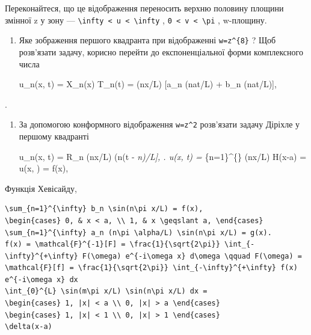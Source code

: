 \documentclass[
  ukrainian,
]{article}
\begin{document}
Переконайтеся, що це відображення переносить верхню половину площини
змінної z у зону ---
\texttt{\textbackslash{}infty\ \textless{}\ u\ \textless{}\ \textbackslash{}infty}
, \texttt{0\ \textless{}\ v\ \textless{}\ \textbackslash{}pi} ,
w-площину.

\begin{enumerate}
\def\labelenumi{\arabic{enumi}.}
\setcounter{enumi}{1}
\item
  Яке зображення першого квадранта при відображенні
  \texttt{w=z\^{}\{8\}} ? Щоб розв'язати задачу, корисно перейти до
  експоненціальної форми комплексного числа

  u\_n(x, t) = X\_n(x) T\_n(t) = \sin(n\pi x/L) {[}a\_n \sin(n\pi at/L)
  + b\_n \cos(n\pi at/L){]},
\end{enumerate}

.

\begin{enumerate}
\def\labelenumi{\arabic{enumi}.}
\setcounter{enumi}{2}
\item
  За допомогою конформного відображення \texttt{w=z\^{}2} розв'язати
  задачу Діріхле у першому квадранті

  u\_n(x, t) = R\_n \sin(n\pi x/L) \cos(n\pi\alpha (t -
  \delta\emph{n)/L{]}, \right. u(x, t) = \sum}\{n=1\}\^{}\{\infty\}
  \sin(n\pi x/L)
   H(x-a) = u(x, \theta) = f(x),
\end{enumerate}

Функція Хевісайду,

\begin{verbatim}
\sum_{n=1}^{\infty} b_n \sin(n\pi x/L) = f(x),
\begin{cases} 0, & x < a, \\ 1, & x \geqslant a, \end{cases}
\sum_{n=1}^{\infty} a_n (n\pi \alpha/L) \sin(n\pi x/L) = g(x).
f(x) = \mathcal{F}^{-1}[F] = \frac{1}{\sqrt{2\pi}} \int_{-\infty}^{+\infty} F(\omega) e^{-i\omega x} d\omega \qquad F(\omega) = \mathcal{F}[f] = \frac{1}{\sqrt{2\pi}} \int_{-\infty}^{+\infty} f(x) e^{-i\omega x} dx
\int_{0}^{L} \sin(m\pi x/L) \sin(n\pi x/L) dx =
\begin{cases} 1, |x| < a \\ 0, |x| > a \end{cases}
\begin{cases} 1, |x| < 1 \\ 0, |x| > 1 \end{cases}
\delta(x-a)
\end{verbatim}
\end{document}
